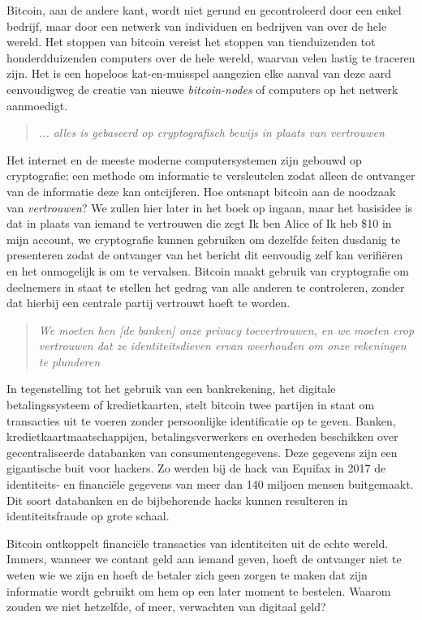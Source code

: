 \documentclass[
  letterpaper,
]{scrbook}
\begin{document}
Bitcoin, aan de andere kant, wordt niet gerund en gecontroleerd door een
enkel bedrijf, maar door een netwerk van individuen en bedrijven van
over de hele wereld. Het stoppen van bitcoin vereist het stoppen van
tienduizenden tot honderdduizenden computers over de hele wereld,
waarvan velen lastig te traceren zijn. Het is een hopeloos
kat-en-muisspel aangezien elke aanval van deze aard eenvoudigweg de
creatie van nieuwe \emph{bitcoin-nodes} of computers op het netwerk
aanmoedigt.

\begin{quote}
\emph{... alles is gebaseerd op cryptografisch bewijs in plaats van
vertrouwen}
\end{quote}

Het internet en de meeste moderne computersystemen zijn gebouwd op
cryptografie; een methode om informatie te versleutelen zodat alleen de
ontvanger van de informatie deze kan ontcijferen. Hoe ontsnapt bitcoin
aan de noodzaak van \emph{vertrouwen}? We zullen hier later in het boek
op ingaan, maar het basisidee is dat in plaats van iemand te vertrouwen
die zegt Ik ben Alice of Ik heb \$10 in mijn account, we cryptografie
kunnen gebruiken om dezelfde feiten dusdanig te presenteren zodat de
ontvanger van het bericht dit eenvoudig zelf kan verifiëren en het
onmogelijk is om te vervalsen. Bitcoin maakt gebruik van cryptografie om
deelnemers in staat te stellen het gedrag van alle anderen te
controleren, zonder dat hierbij een centrale partij vertrouwt hoeft te
worden.

\begin{quote}
\emph{We moeten hen {[}de banken{]} onze privacy toevertrouwen, en we
moeten erop vertrouwen dat ze identiteitsdieven ervan weerhouden om onze
rekeningen te plunderen}
\end{quote}

In tegenstelling tot het gebruik van een bankrekening, het digitale
betalingssysteem of kredietkaarten, stelt bitcoin twee partijen in staat
om transacties uit te voeren zonder persoonlijke identificatie op te
geven. Banken, kredietkaartmaatschappijen, betalingsverwerkers en
overheden beschikken over gecentraliseerde databanken van
consumentengegevens. Deze gegevens zijn een gigantische buit voor
hackers. Zo werden bij de hack van Equifax in 2017 de identiteits- en
financiële gegevens van meer dan 140 miljoen mensen buitgemaakt. Dit
soort databanken en de bijbehorende hacks kunnen resulteren in
identiteitsfraude op grote schaal.

Bitcoin ontkoppelt financiële transacties van identiteiten uit de echte
wereld. Immers, wanneer we contant geld aan iemand geven, hoeft de
ontvanger niet te weten wie we zijn en hoeft de betaler zich geen zorgen
te maken dat zijn informatie wordt gebruikt om hem op een later moment
te bestelen. Waarom zouden we niet hetzelfde, of meer, verwachten van
digitaal geld?
\end{document}
